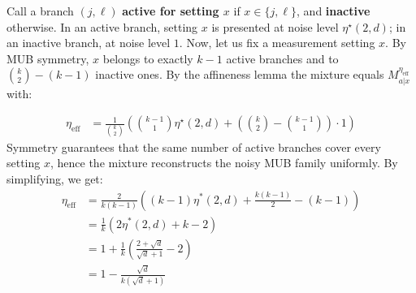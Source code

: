 \documentclass[oneside, a4paper, onecolumn, 11pt]{article}
\theoremstyle{definition}
\theoremstyle{plain}
\theoremstyle{remark}
\begin{document}
Call a branch $(j,\ell)$ \textbf{active for setting $x$} if $x \in \{j,\ell\}$, and \textbf{inactive} otherwise. In an active branch, setting $x$ is presented at noise level $\eta^\star(2,d)$; in an inactive branch, at noise level $1$.
\newline Now, let us fix a measurement setting
$x$. By MUB symmetry, 
$x$ belongs to exactly $k-1$
 active branches and to $ \binom{k}{2} - (k-1) $ inactive ones. 
By the affineness lemma the mixture equals $M^{\eta_{\text{eff}}}_{a|x}$
with:


\begin{equation}
\begin{aligned}
\eta_{\text{eff}} &= \frac{1}{\binom{k}{2}} \left( \binom{k-1}{1} \eta^{\star}(2, d) + \left( \binom{k}{2} - \binom{k-1}{1} \right) \cdot 1 \right) 
\end{aligned} \end{equation}
Symmetry guarantees that the same number of active branches cover every setting $x$, hence the mixture reconstructs the noisy MUB family uniformly.
By simplifying, we get:
\begin{equation}
\begin{aligned}
\eta_{\text{eff}} &= \frac{2}{k(k-1)} ((k-1) \eta^*(2, d) + \frac{k(k-1)}{2} - (k - 1)) \\ 
&= \frac{1}{k} (2 \eta^*(2, d) + k - 2) \\
&= 1 + \frac{1}{k} (\frac{2 + \sqrt{d}}{\sqrt{d} + 1} - 2) \\
&= 1 - \frac{\sqrt{d}}{k(\sqrt{d} + 1)} \label{eq:lower-bound-k-wise}
\end{aligned}
\end{equation} 
\end{document}
